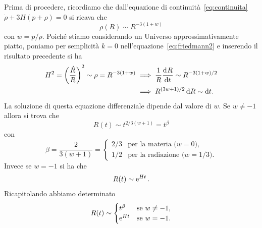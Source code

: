 Prima di procedere, ricordiamo che dall'equazione di
continuità~\eqref{eq:continuita} \(\dot{\rho} + 3H(p + \rho) = 0\) si ricava che
\begin{equation}
  \rho(R) \sim R^{-3(1+w)}
\end{equation}
con \(w = p/\rho\).  Poiché stiamo considerando un Universo approssimativamente
piatto, poniamo per semplicità \(k=0\) nell'equazione~\eqref{eq:friedmann2} e
inserendo il risultato precedente si ha
\begin{equation}
  \begin{split}
    H^{2} = \left(\frac{\dot{R}}{R}\right)^{2} \sim \rho = R^{-3(1+w)} &\implies
    \frac{1}{R} \frac{{\mathop{}\!\mathrm{d}^{}}R}{\mathop{}\!\mathrm{d} {t}^{}} \sim R^{-3(1+w)/2} \\
    &\implies R^{(3w+1)/2}\mathop{}\!\mathrm{d} R \sim \mathop{}\!\mathrm{d} t.
  \end{split}
\end{equation}
La soluzione di questa equazione differenziale dipende dal valore di \(w\).  Se
\(w\neq -1\) allora si trova che
\begin{equation}
  R(t) \sim t^{2/3(w+1)} = t^{\beta}
\end{equation}
con
\begin{equation}
  \beta = \frac{2}{3(w+1)} =
  \begin{cases}
    2/3 & \text{per la materia (\(w = 0\))}, \\
    1/2 & \text{per la radiazione (\(w = 1/3\))}.
  \end{cases}
\end{equation}
Invece se \(w = -1\) si ha che
\begin{equation}
  R(t) \sim \operatorname{\mathrm{e}}^{Ht}.
\end{equation}
Ricapitolando abbiamo determinato
\begin{equation}
  R(t) \sim
  \begin{cases}
    t^{\beta} & \text{se \(w\neq -1\)}, \\
    \operatorname{\mathrm{e}}^{Ht}  & \text{se \(w = -1\)}.
  \end{cases}
\end{equation}

